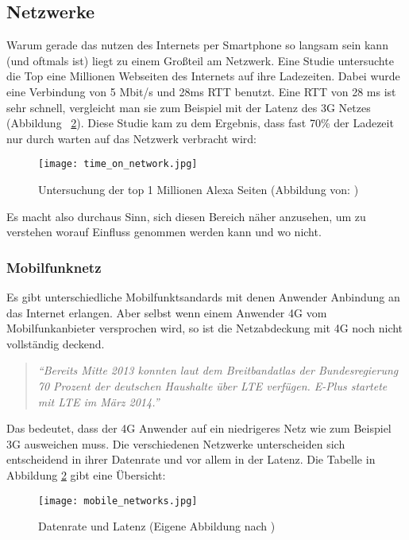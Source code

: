 	\subsection{Netzwerke} %
	\label{sub:netzwerke}
		Warum gerade das nutzen des Internets per Smartphone so langsam sein kann (und oftmals ist) liegt zu einem Großteil am Netzwerk. Eine Studie untersuchte die Top eine Millionen Webseiten des Internets auf ihre Ladezeiten. Dabei wurde eine Verbindung von 5 Mbit/s und 28ms RTT benutzt. Eine RTT von 28 ms ist sehr schnell, vergleicht man sie zum Beispiel mit der Latenz des 3G Netzes (Abbildung ~\ref{fig:mobile_networks}). Diese Studie kam zu dem Ergebnis, dass fast 70\% der Ladezeit nur durch warten auf das Netzwerk verbracht wird:

		\begin{figure}[htbp]
			\begin{center}
				\texttt{[image: time\_on\_network.jpg]}
				\caption{Untersuchung der top 1 Millionen Alexa Seiten (Abbildung von: \autocite{alexa})}
				\label{fig:time_on_network}
			\end{center}
		\end{figure}

		Es macht also durchaus Sinn, sich diesen Bereich näher anzusehen, um zu verstehen worauf Einfluss genommen werden kann und wo nicht.

		\subsubsection{Mobilfunknetz} %
		\label{ssub:Mobilfunknetz}
			Es gibt unterschiedliche Mobilfunktsandards mit denen Anwender Anbindung an das Internet erlangen. Aber selbst wenn einem Anwender 4G vom Mobilfunkanbieter versprochen wird, so ist die Netzabdeckung mit 4G noch nicht vollständig deckend.
			\begin{quote}
				\textit{"`Bereits Mitte 2013 konnten laut dem Breitbandatlas der Bundesregierung 70 Prozent der deutschen Haushalte über LTE verfügen. E-Plus startete mit LTE im März 2014."' \autocite{netzagentur}}
			\end{quote}

			Das bedeutet, dass der 4G Anwender auf ein niedrigeres Netz wie zum Beispiel 3G ausweichen muss. Die verschiedenen Netzwerke unterscheiden sich entscheidend in ihrer Datenrate und vor allem in der Latenz. Die Tabelle in Abbildung \ref{fig:mobile_networks} gibt eine Übersicht:

			\begin{figure}[htbp]
				\begin{center}
					\texttt{[image: mobile\_networks.jpg]}
					\caption{Datenrate und Latenz (Eigene Abbildung nach \autocite{grigorikGNetwork})}
					\label{fig:mobile_networks}
				\end{center}
			\end{figure}

